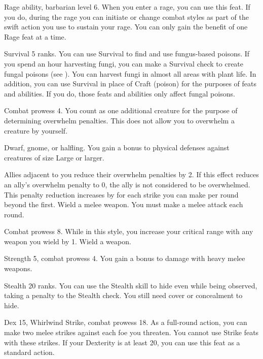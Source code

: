 \featpre Rage ability, barbarian level 6.
\featben When you enter a rage, you can use this feat. If you do, during the rage you can initiate or change combat styles as part of the swift action you use to sustain your rage.
 You can only gain the benefit of one Rage feat at a time.

\featpre Survival 5 ranks.
\featben You can use Survival to find and use fungus-based poisons.
If you spend an hour harvesting fungi, you can make a Survival check to create fungal poisons (see ).
You can harvest fungi in almost all areas with plant life.
In addition, you can use Survival in place of Craft (poison) for the purposes of feats and abilities.
If you do, those feats and abilities only affect fungal poisons.

\featpre Combat prowess 4.
\featben You count as one additional creature for the purpose of determining overwhelm penalties.
This does not allow you to overwhelm a creature by yourself.

\featpres Dwarf, gnome, or halfling.
\featben You gain a  bonus to physical defenses against creatures of size Large or larger.

\featben Allies adjacent to you reduce their overwhelm penalties by 2.
If this effect reduces an ally's overwhelm penalty to 0, the ally is not considered to be overwhelmed.
This penalty reduction increases by  for each strike you can make per round beyond the first.
\stylereq Wield a melee weapon.
You must make a melee attack each round.

\featpre Combat prowess 8.
\featben While in this style, you increase your critical range with any weapon you wield by 1.
\stylereq Wield a weapon.

\featpre Strength 5, combat prowess 4.
\featben You gain a  bonus to damage with heavy melee weapons.

\featpre Stealth 20 ranks.
\featben You can use the Stealth skill to hide even while being observed, taking a  penalty to the Stealth check.
You still need cover or concealment to hide.

\featpres Dex 15, Whirlwind Strike, combat prowess 18.
\featben As a full-round action, you can make two melee strikes against each foe you threaten. You cannot use Strike feats with these strikes.
If your Dexterity is at least 20, you can use this feat as a standard action.

